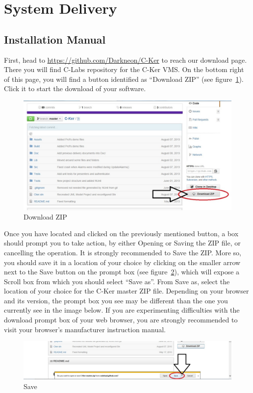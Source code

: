 \documentclass[12pt]{article}
\begin{document}
\section{System Delivery}

\subsection{Installation Manual}
\vspace*{0.2in}
\vspace*{0.2in}
First, head to \url{https://github.com/Darkneon/C-Ker} to reach our download page. There you will find C-Labs repository for the C-Ker VMS. On the bottom right of this page, you will find a button identified as “Download ZIP” (see figure~\ref{fig:Download ZIP}). Click it to start the download of your software.
\begin{figure}[h!]
    \centering
    \includegraphics[scale=1]{insta1}
    \caption{Download ZIP}
    \label{fig:Download ZIP}
\end{figure}\par

Once you have located and clicked on the previously mentioned button, a box should prompt you to take action, by either Opening or Saving the ZIP file, or cancelling the operation. It is strongly recommended to Save the ZIP. More so, you should save it in a location of your choice by clicking on the smaller arrow next to the Save button on the prompt box (see figure~\ref{fig:Save}), which will expose a Scroll box from which you should select “Save as”. From Save as, select the location of your choice for the C-Ker master ZIP file. Depending on your browser and its version, the prompt box you see may be different than the one you currently see in the image below. If you are experimenting difficulties with the download prompt box of your web browser, you are strongly recommended to visit your browser’s manufacturer instruction manual.
\begin{figure}[h!]
    \centering
    \includegraphics[scale=1]{insta2}
    \caption{Save}
    \label{fig:Save}
\end{figure}\par
\end{document}
